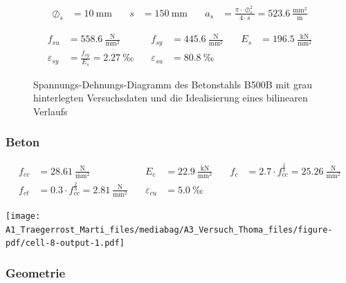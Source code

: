 \documentclass[
  11pt,
  letterpaper,
]{scrreprt}
\begin{document}
\[
\begin{aligned}
\oslash_{s}& = 10 \ \mathrm{mm} \quad & s& = 150 \ \mathrm{mm} \quad & a_{s}& = \frac{\pi \cdot \oslash_{s}^{2}}{4 \cdot s} = 523.6 \ \frac{\mathrm{mm}^{2}}{\mathrm{m}} \end{aligned}
\]

\[
\begin{aligned}
f_{su}& = 558.6 \ \frac{\mathrm{N}}{\mathrm{mm}^{2}} \quad & f_{sy}& = 445.6 \ \frac{\mathrm{N}}{\mathrm{mm}^{2}} \quad & E_{s}& = 196.5 \ \frac{\mathrm{kN}}{\mathrm{mm}^{2}} \\ 
\varepsilon_{sy}& = \frac{f_{sy}}{E_{s}} = 2.27 \ \mathrm{‰} \quad & \varepsilon_{su}& = 80.8 \ \mathrm{‰} \quad &  
 \end{aligned}
\]

\begin{figure}[H]


\caption{\label{fig-tho_stress_strain_b500b}Spannungs-Dehnungs-Diagramm
des Betonstahls B500B mit grau hinterlegten Versuchsdaten und die
Idealisierung eines bilinearen Verlaufs}

\end{figure}%

\subsubsection{Beton}\label{beton-1}

\[
\begin{aligned}
f_{cc}& = 28.61 \ \frac{\mathrm{N}}{\mathrm{mm}^{2}} \quad & E_{c}& = 22.9 \ \frac{\mathrm{kN}}{\mathrm{mm}^{2}} \quad & f_{c}& = 2.7 \cdot f_{cc}^{\frac{2}{3}} = 25.26 \ \frac{\mathrm{N}}{\mathrm{mm}^{2}} \\ 
f_{ct}& = 0.3 \cdot f_{cc}^{\frac{2}{3}} = 2.81 \ \frac{\mathrm{N}}{\mathrm{mm}^{2}} \quad & \varepsilon_{cu}& = 5.0 \ \mathrm{‰} \quad &  
 \end{aligned}
\]

\texttt{[image: A1\_Traegerrost\_Marti\_files/mediabag/A3\_Versuch\_Thoma\_files/figure-pdf/cell-8-output-1.pdf]}

\subsubsection{Geometrie}\label{geometrie-1}
\end{document}
